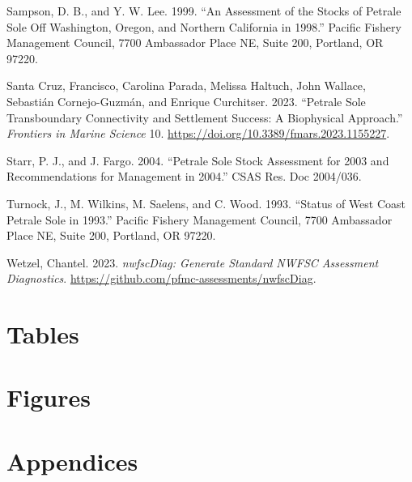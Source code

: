 \documentclass[
]{scrartcl}
\newlength{\cslhangindent}
\newenvironment{CSLReferences}[2] %
 {\begin{list}{}{%
  \setlength{\itemindent}{0pt}
  \setlength{\leftmargin}{0pt}
  \setlength{\parsep}{0pt}
  \ifodd #1
   \setlength{\leftmargin}{\cslhangindent}
   \setlength{\itemindent}{-1\cslhangindent}
  \fi
  \setlength{\itemsep}{#2\baselineskip}}}
 {\end{list}}
\begin{document}
\begin{CSLReferences}{1}{0}
Sampson, D. B., and Y. W. Lee. 1999. {``An Assessment of the Stocks of
Petrale Sole Off {Washington}, {Oregon}, and {Northern} {California} in
1998.''} Pacific Fishery Management Council, 7700 Ambassador Place NE,
Suite 200, Portland, OR 97220.

Santa Cruz, Francisco, Carolina Parada, Melissa Haltuch, John Wallace,
Sebastián Cornejo-Guzmán, and Enrique Curchitser. 2023. {``Petrale Sole
Transboundary Connectivity and Settlement Success: A Biophysical
Approach.''} \emph{Frontiers in Marine Science} 10.
\url{https://doi.org/10.3389/fmars.2023.1155227}.

Starr, P. J., and J. Fargo. 2004. {``Petrale Sole Stock Assessment for
2003 and Recommendations for Management in 2004.''} CSAS Res. Doc
2004/036.

Turnock, J., M. Wilkins, M. Saelens, and C. Wood. 1993. {``Status of
{West} {Coast} Petrale Sole in 1993.''} Pacific Fishery Management
Council, 7700 Ambassador Place NE, Suite 200, Portland, OR 97220.

Wetzel, Chantel. 2023. \emph{nwfscDiag: Generate Standard NWFSC
Assessment Diagnostics}.
\url{https://github.com/pfmc-assessments/nwfscDiag}.

\end{CSLReferences}

\newpage{}

\section{Tables}\label{tables}

\newpage{}

\section{Figures}\label{figures}

\newpage{}

\section{Appendices}\label{appendices}
\end{document}

